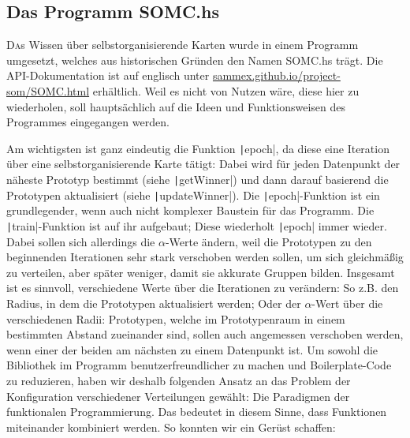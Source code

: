 \documentclass[twoside,a4paper]{article}
\newcommand{\haskell}[1]{\texttt|#1|}
\newcommand{\commonlettrine}[1]{\lettrine[nindent=0em,lines=2]{#1}}
\begin{document}
\subsection{Das Programm \glqq{}SOMC.hs\grqq{}}

\commonlettrine{D}as Wissen über selbstorganisierende Karten wurde in einem Programm umgesetzt, welches aus historischen Gründen den Namen SOMC.hs trägt. Die API-Dokumentation ist auf englisch unter \url{sammex.github.io/project-som/SOMC.html} erhältlich. Weil es nicht von Nutzen wäre, diese hier zu wiederholen, soll hauptsächlich auf die Ideen und Funktionsweisen des Programmes eingegangen werden.

Am wichtigsten ist ganz eindeutig die Funktion \haskell{epoch}, da diese eine Iteration über eine selbstorganisierende Karte tätigt: Dabei wird für jeden Datenpunkt der näheste Prototyp bestimmt (siehe \haskell{getWinner}) und dann darauf basierend die Prototypen aktualisiert (siehe \haskell{updateWinner}). Die \haskell{epoch}-Funktion ist ein grundlegender, wenn auch nicht komplexer Baustein für das Programm. Die \haskell{train}-Funktion ist auf ihr aufgebaut; Diese wiederholt \haskell{epoch} immer wieder. Dabei sollen sich allerdings die \(\alpha\)-Werte ändern, weil die Prototypen zu den beginnenden Iterationen sehr stark verschoben werden sollen, um sich gleichmäßig zu verteilen, aber später weniger, damit sie akkurate Gruppen bilden. Insgesamt ist es sinnvoll, verschiedene Werte über die Iterationen zu verändern: So z.B. den Radius, in dem die Prototypen aktualisiert werden; Oder der \(\alpha\)-Wert über die verschiedenen Radii: Prototypen, welche im Prototypenraum in einem bestimmten Abstand zueinander sind, sollen auch angemessen verschoben werden, wenn einer der beiden am nächsten zu einem Datenpunkt ist. Um sowohl die Bibliothek im Programm benutzerfreundlicher zu machen und Boilerplate-Code zu reduzieren, haben wir deshalb folgenden Ansatz an das Problem der Konfiguration verschiedener Verteilungen gewählt: Die Paradigmen der funktionalen Programmierung. Das bedeutet in diesem Sinne, dass Funktionen miteinander kombiniert werden. So konnten wir ein Gerüst schaffen:
\end{document}
